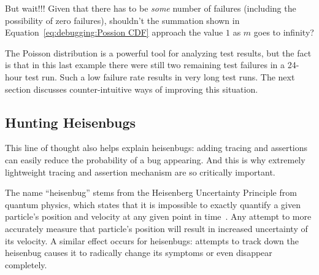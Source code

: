\QuickQuiz{}
	But wait!!!
	Given that there has to be \emph{some} number of failures
	(including the possibility of zero failures),
	shouldn't the summation shown in
	Equation~\ref{eq:debugging:Possion CDF}
	approach the value $1$ as $m$ goes to infinity?
 \QuickQuizEnd

The Poisson distribution is a powerful tool for analyzing test results,
but the fact is that in this last example there were still two remaining
test failures in a 24-hour test run.
Such a low failure rate results in very long test runs.
The next section discusses counter-intuitive ways of improving this situation.

\subsection{Hunting Heisenbugs}
\label{sec:debugging:Hunting Heisenbugs}

This line of thought also helps explain heisenbugs:
adding tracing and assertions can easily reduce the probability
of a bug appearing.
And this is why extremely lightweight tracing and assertion mechanism are
so critically important.

The name ``heisenbug'' stems from the Heisenberg Uncertainty Principle
from quantum physics, which states that it is impossible to exactly
quantify a given particle's position and velocity at any given point
in time~\cite{WeinerHeisenberg1927Uncertain}.
Any attempt to more accurately measure that particle's position will
result in increased uncertainty of its velocity.
A similar effect occurs for heisenbugs: attempts to track down the heisenbug
causes it to radically change its symptoms or even disappear completely.

